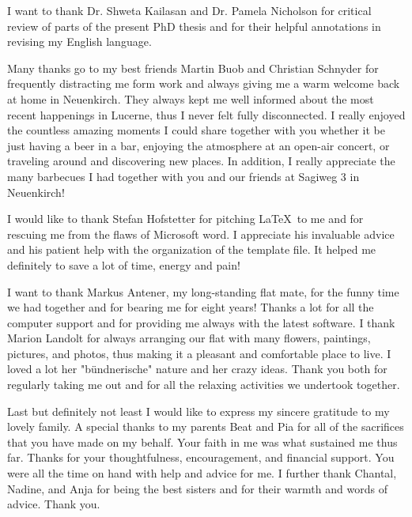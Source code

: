 \begin{addmargin}{0.025\textwidth}
\par\medskip 
\noindent
I want to thank Dr. Shweta Kailasan and Dr. Pamela Nicholson for critical review of parts of the present PhD thesis and for their helpful annotations in revising my English language. 
   

\par\medskip 
\noindent
Many thanks go to my best friends Martin Buob and Christian Schnyder for frequently distracting me form work and always giving me a warm welcome back at home in Neuenkirch. They always kept me well informed about the most recent happenings in Lucerne, thus I never felt fully disconnected. I really enjoyed the countless amazing moments I could share together with you whether it be just having a beer in a bar, enjoying the atmosphere at an open-air concert, or traveling around and discovering new places. In addition, I really appreciate the many barbecues I had together with you and our friends at Sagiweg 3 in Neuenkirch!            


\par\medskip 
\noindent
I would like to thank Stefan Hofstetter for pitching \LaTeX~to me and for rescuing me from the flaws of Microsoft word. I appreciate his invaluable advice and his patient help with the organization of the template file. It helped me definitely to save a lot of time, energy and pain! 

\par\medskip 
\noindent
I want to thank Markus Antener, my long-standing flat mate, for the funny time we had together and for bearing me for eight years! Thanks a lot for all the computer support and for providing me always with the latest software. I thank Marion Landolt for always arranging our flat with many flowers, paintings, pictures, and photos, thus making it a pleasant and comfortable place to live. I loved a lot her "bündnerische" nature and her crazy ideas. Thank you both for regularly taking me out and for all the relaxing activities we undertook together.

\par\medskip 
\noindent
Last but definitely not least I would like to express my sincere gratitude to my lovely family. A special thanks to my parents Beat and Pia for all of the sacrifices that you have made on my behalf. Your faith in me was what sustained me thus far. Thanks for your thoughtfulness, encouragement, and financial support. You were all the time on hand with help and advice for me. I further thank Chantal, Nadine, and Anja for being the best sisters and for their warmth and words of advice. Thank you.  



\end{addmargin}
